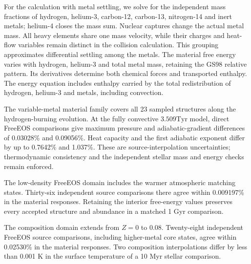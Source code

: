 \documentclass[11pt,letterpaper]{article}
\newcommand{\Tyr}{\mathrm{Tyr}}
\begin{document}
For the calculation with metal settling, we solve for the independent mass
fractions of hydrogen, helium-3, carbon-12, carbon-13, nitrogen-14 and inert
metals; helium-4 closes the mass sum. Nuclear captures change the actual
metal mass. All heavy elements share one mass velocity, while their charges
and heat-flow variables remain distinct in the collision calculation.
This grouping approximates differential settling among the metals.
The material free energy varies with hydrogen, helium-3 and total metal
mass, retaining the GS98 relative pattern. Its derivatives determine both
chemical forces and transported enthalpy. The energy equation includes
enthalpy carried by the total redistribution of hydrogen, helium-3 and
metals, including convection.

The variable-metal material family covers all 23 sampled structures along
the hydrogen-burning evolution. At the fully convective $3.509\Tyr$ model,
direct FreeEOS comparisons give maximum pressure and adiabatic-gradient
differences of 0.03028\% and 0.09056\%. Heat capacity and the first adiabatic
exponent differ by up to 0.7642\% and 1.037\%. These are source-interpolation
uncertainties; thermodynamic consistency and the independent stellar mass
and energy checks remain enforced.

The low-density FreeEOS domain includes the warmer atmospheric matching
states. Thirty-six independent source comparisons there agree within
0.009197\% in the material responses. Retaining the interior free-energy
values preserves every accepted structure and abundance in a matched
1 Gyr comparison.

The composition domain extends from $Z=0$ to 0.08. Twenty-eight independent
FreeEOS source comparisons, including higher-metal core states, agree within
0.02530\% in the material responses. Two composition interpolations differ
by less than 0.001 K in the surface temperature of a 10 Myr stellar comparison.
\end{document}
